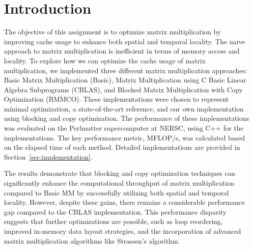 \section{Introduction}
\begin{comment}
    for each of the problem statement, approach statement, and findings/result statement from the abstract, amplify these into a short paragraph for each. Here, a short paragraph means 3-4 sentences.
\end{comment}


The objective of this assignment is to optimize matrix multiplication by improving cache usage to enhance both spatial and temporal locality. The naive approach to matrix multiplication is inefficient in terms of memory access and locality. To explore how we can optimize the cache usage of matrix multiplication, we implemented three different matrix multiplication approaches: Basic Matrix Multiplication (Basic), Matrix Multiplication using C Basic Linear Algebra Subprograms (CBLAS), and Blocked Matrix Multiplication with Copy Optimization (BMMCO). These implementations were chosen to represent minimal optimization, a state-of-the-art reference, and our own implementation using blocking and copy optimization. 
The performance of these implementations was evaluated on the Perlmutter supercomputer at NERSC, using C++ for the implementations. The key performance metric, MFLOP/s, was calculated based on the elapsed time of each method. Detailed implementations are provided in Section~\ref{sec:implementation}.



The results demonstrate that blocking and copy optimization techniques can significantly enhance the computational throughput of matrix multiplication compared to Basic MM by successfully utilizing both spatial and temporal locality. However, despite these gains, there remains a considerable performance gap compared to the CBLAS implementation. This performance disparity suggests that further optimizations are possible, such as loop reordering, improved in-memory data layout strategies, and the incorporation of advanced matrix multiplication algorithms like Strassen’s algorithm.

